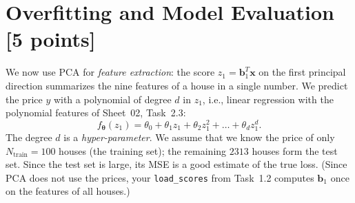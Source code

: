 \documentclass[hidelinks,10pt]{article}
\providecommand{\xx}{\mathbf{x}}
\providecommand{\tth}{\bm{\theta}}
\providecommand{\bb}{\mathbf{b}}
\begin{document}
\section{Overfitting and Model Evaluation [5 points]}

We now use PCA for \emph{feature extraction}: the score $z_1 = \bb_1^T\xx$ on the first principal direction summarizes the nine features of a house in a single number. We predict the price $y$ with a polynomial of degree $d$ in $z_1$, i.e., linear regression with the polynomial features of Sheet~02, Task~2.3:
\begin{equation}
    f_{\tth}(z_1) = \theta_0 + \theta_1 z_1 + \theta_2 z_1^2 + \dots + \theta_d z_1^d.
    \label{eq:poly}
\end{equation}
The degree $d$ is a \emph{hyper-parameter}. We assume that we know the price of only $N_{\mathrm{train}} = 100$ houses (the training set); the remaining $2313$ houses form the test set. Since the test set is large, its MSE is a good estimate of the true loss. (Since PCA does not use the prices, your \texttt{load\_scores} from Task~1.2 computes $\bb_1$ once on the features of all houses.)
\end{document}
